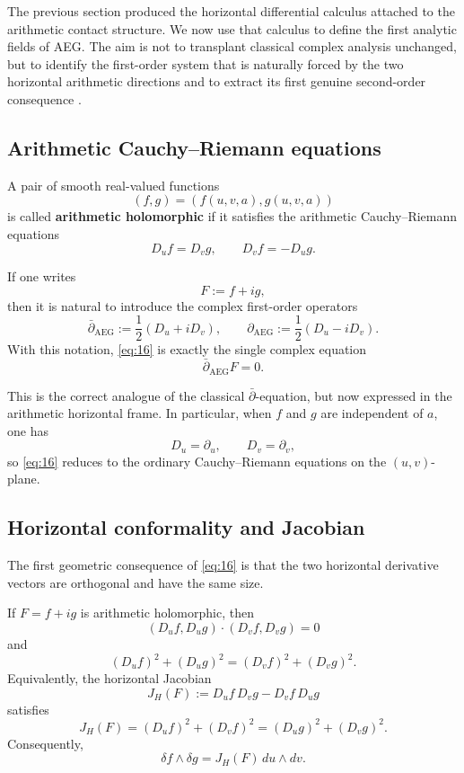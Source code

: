 The previous section produced the horizontal differential calculus attached to the arithmetic contact structure. We now use that calculus to define the first analytic fields of AEG. The aim is not to transplant classical complex analysis unchanged, but to identify the first-order system that is naturally forced by the two horizontal arithmetic directions and to extract its first genuine second-order consequence \cite{Ahlfors1979ComplexAnalysis}.

\subsection{Arithmetic Cauchy--Riemann equations}

\begin{definition}
A pair of smooth real-valued functions
\[
(f,g)=(f(u,v,a),g(u,v,a))
\]
is called \textbf{arithmetic holomorphic} if it satisfies the arithmetic Cauchy--Riemann equations
\begin{equation}\label{eq:16}\tag{16}
D_u f=D_v g,
\qquad
D_v f=-D_u g.
\end{equation}
\end{definition}

If one writes
\[
F:=f+ig,
\]
then it is natural to introduce the complex first-order operators
\begin{equation}\label{eq:17}\tag{17}
\bar\partial_{\mathrm{AEG}}
:=\frac12(D_u+iD_v),
\qquad
\partial_{\mathrm{AEG}}
:=\frac12(D_u-iD_v).
\end{equation}
With this notation, \eqref{eq:16} is exactly the single complex equation
\[
\bar\partial_{\mathrm{AEG}}F=0.
\]

This is the correct analogue of the classical $\bar\partial$-equation, but now expressed in the arithmetic horizontal frame. In particular, when $f$ and $g$ are independent of $a$, one has
\[
D_u=\partial_u,
\qquad
D_v=\partial_v,
\]
so \eqref{eq:16} reduces to the ordinary Cauchy--Riemann equations on the $(u,v)$-plane.

\subsection{Horizontal conformality and Jacobian}

The first geometric consequence of \eqref{eq:16} is that the two horizontal derivative vectors are orthogonal and have the same size.

\begin{proposition}\label{prop:arithmetic_holomorphic_conformality}
If $F=f+ig$ is arithmetic holomorphic, then
\[
(D_u f,D_u g)\cdot(D_v f,D_v g)=0
\]
and
\[
(D_u f)^2+(D_u g)^2=(D_v f)^2+(D_v g)^2.
\]
Equivalently, the horizontal Jacobian
\[
J_H(F):=D_u f\,D_v g-D_v f\,D_u g
\]
satisfies
\begin{equation}\label{eq:18}\tag{18}
J_H(F)
=(D_u f)^2+(D_v f)^2
=(D_u g)^2+(D_v g)^2.
\end{equation}
Consequently,
\[
\delta f\wedge \delta g
=
J_H(F)\,du\wedge dv.
\]
\end{proposition}

